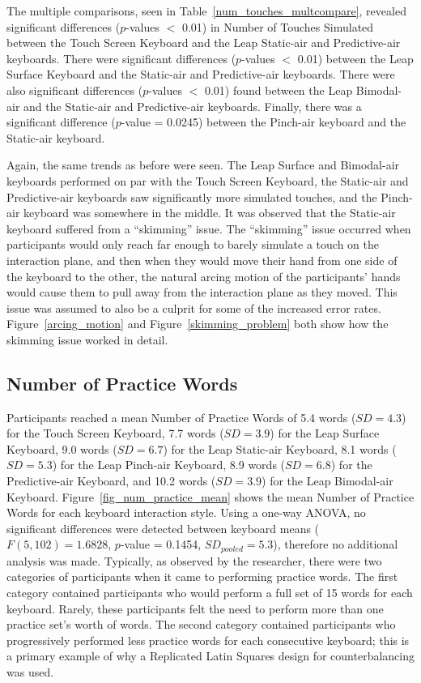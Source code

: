 The multiple comparisons, seen in Table~\ref{num_touches_multcompare}, revealed significant differences ($p$-values $<$ 0.01) in Number of Touches Simulated between the Touch Screen Keyboard and the Leap Static-air and Predictive-air keyboards. There were significant differences ($p$-values $<$ 0.01) between the Leap Surface Keyboard and the Static-air and Predictive-air keyboards. There were also significant differences ($p$-values $<$ 0.01) found between the Leap Bimodal-air and the Static-air and Predictive-air keyboards. Finally, there was a significant difference ($p$-value = 0.0245) between the Pinch-air keyboard and the Static-air keyboard.

Again, the same trends as before were seen. The Leap Surface and Bimodal-air keyboards performed on par with the Touch Screen Keyboard, the Static-air and Predictive-air keyboards saw significantly more simulated touches, and the Pinch-air keyboard was somewhere in the middle. It was observed that the Static-air keyboard suffered from a ``skimming'' issue. The ``skimming'' issue occurred when participants would only reach far enough to barely simulate a touch on the interaction plane, and then when they would move their hand from one side of the keyboard to the other, the natural arcing motion of the participants' hands would cause them to pull away from the interaction plane as they moved. This issue was assumed to also be a culprit for some of the increased error rates. Figure~\ref{arcing_motion} and Figure~\ref{skimming_problem} both show how the skimming issue worked in detail. %

\subsection{Number of Practice Words}
Participants reached a mean Number of Practice Words of 5.4 words ($SD = 4.3$) for the Touch Screen Keyboard, 7.7 words ($SD = 3.9$) for the Leap Surface Keyboard, 9.0 words ($SD = 6.7$) for the Leap Static-air Keyboard, 8.1 words ($SD = 5.3$) for the Leap Pinch-air Keyboard, 8.9 words ($SD = 6.8$) for the Predictive-air Keyboard, and 10.2 words ($SD = 3.9$) for the Leap Bimodal-air Keyboard. Figure~\ref{fig_num_practice_mean} shows the mean Number of Practice Words for each keyboard interaction style. Using a one-way ANOVA, no significant differences were detected between keyboard means ($F(5, 102) = 1.6828$, $p$-value = 0.1454, $SD_{pooled} = 5.3$), therefore no additional analysis was made. Typically, as observed by the researcher, there were two categories of participants when it came to performing practice words. The first category contained participants who would perform a full set of 15 words for each keyboard. Rarely, these participants felt the need to perform more than one practice set's worth of words. The second category contained participants who progressively performed less practice words for each consecutive keyboard; this is a primary example of why a Replicated Latin Squares design for counterbalancing was used.


